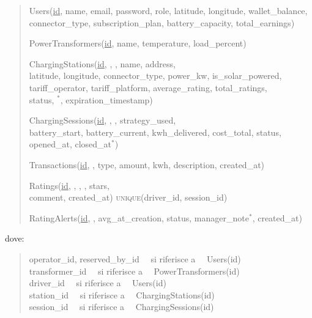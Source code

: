 \begin{quote}
\ttfamily
Users(\uline{id}, name, email, password, role, latitude, longitude, wallet\_balance,\\
\hspace*{3.2em}connector\_type, subscription\_plan, battery\_capacity, total\_earnings)

\vspace{0.8em}
PowerTransformers(\uline{id}, name, temperature, load\_percent)

\vspace{0.8em}
ChargingStations(\uline{id}, , , name, address,\\
\hspace*{3.2em}latitude, longitude, connector\_type, power\_kw, is\_solar\_powered,\\
\hspace*{3.2em}tariff\_operator, tariff\_platform, average\_rating, total\_ratings,\\
\hspace*{3.2em}status, $^{\ast}$, expiration\_timestamp)

\vspace{0.8em}
ChargingSessions(\uline{id}, , , strategy\_used,\\
\hspace*{3.2em}battery\_start, battery\_current, kwh\_delivered, cost\_total, status,\\
\hspace*{3.2em}opened\_at, closed\_at$^{\ast}$)

\vspace{0.8em}
Transactions(\uline{id}, , type, amount, kwh, description, created\_at)

\vspace{0.8em}
Ratings(\uline{id}, , , , stars,\\
\hspace*{3.2em}comment, created\_at) \quad \textsc{unique}(driver\_id, session\_id)

\vspace{0.8em}
RatingAlerts(\uline{id}, , avg\_at\_creation, status, manager\_note$^{\ast}$, created\_at)
\end{quote}

\vspace{0.3em}
\noindent dove:
\begin{quote}
\ttfamily
operator\_id, reserved\_by\_id \ \ si riferisce a \ \ Users(id)\\
transformer\_id \ \ si riferisce a \ \ PowerTransformers(id)\\
driver\_id \ \ si riferisce a \ \ Users(id)\\
station\_id \ \ si riferisce a \ \ ChargingStations(id)\\
session\_id \ \ si riferisce a \ \ ChargingSessions(id)
\end{quote}

